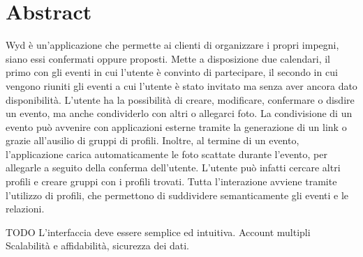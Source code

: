 \newpage
{}
\section{Abstract}

Wyd è un'applicazione che permette ai clienti di organizzare i propri impegni, siano essi confermati oppure proposti.\newline
Mette a disposizione due calendari, il primo con gli eventi in cui l'utente è convinto di partecipare, 
il secondo in cui vengono riuniti gli eventi a cui l'utente è stato invitato ma senza aver ancora dato disponibilità.\newline
L'utente ha la possibilità di creare, modificare, confermare o disdire un evento, ma anche condividerlo con altri o allegarci foto.
La condivisione di un evento può avvenire con applicazioni esterne tramite la generazione di un link o grazie all'ausilio di gruppi di profili.
Inoltre, al termine di un evento, l'applicazione carica automaticamente le foto scattate durante l'evento, per allegarle a seguito della conferma dell'utente.\newline  
L'utente può infatti cercare altri profili e creare gruppi con i profili trovati.\newline
Tutta l'interazione avviene tramite l'utilizzo di profili, che permettono di suddividere semanticamente gli eventi e le relazioni.\newline

TODO\newline
L'interfaccia deve essere semplice ed intuitiva.\newline
Account multipli\newline
Scalabilità e affidabilità, sicurezza dei dati.